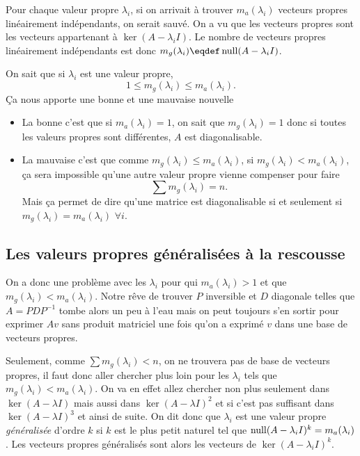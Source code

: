 Pour chaque valeur propre $\lambda_i$,
si on arrivait à trouver $m_a(\lambda_i)$ vecteurs propres linéairement
indépendants, on serait sauvé.
On a vu que les vecteurs propres sont les vecteurs appartenant à
$\ker(A - \lambda_iI)$.
Le nombre de vecteurs propres linéairement indépendants est donc
$m_g(\lambda_i) \eqdef \newnull(A-\lambda_iI)$.

On sait que si $\lambda_i$ est une valeur propre,
\[ 1 \leq m_g(\lambda_i) \leq m_a(\lambda_i). \]
Ça nous apporte une bonne et une mauvaise nouvelle
\begin{itemize}
  \item La bonne c'est que si $m_a(\lambda_i) = 1$,
    on sait que $m_g(\lambda_i) = 1$ donc si toutes les valeurs propres
    sont différentes, $A$ est diagonalisable.
  \item La mauvaise c'est que comme $m_g(\lambda_i) \leq m_a(\lambda_i)$,
    si $m_g(\lambda_i) < m_a(\lambda_i)$, ça sera impossible qu'une
    autre valeur propre vienne compenser pour faire
    \[ \sum m_g(\lambda_i) = n. \]
    Mais ça permet de dire qu'une matrice est diagonalisable si et seulement
    si $m_g(\lambda_i) = m_a(\lambda_i)$ $\forall i$.
\end{itemize}

\subsection{Les valeurs propres généralisées à la rescousse}
On a donc une problème avec les $\lambda_i$ pour qui
$m_a(\lambda_i) > 1$ et que $m_g(\lambda_i) < m_a(\lambda_i)$.
Notre rêve de trouver $P$ inversible et $D$ diagonale
telles que $A = PDP^{-1}$ tombe alors un peu à l'eau mais
on peut toujours s'en sortir pour exprimer $Av$ sans produit matriciel
une fois qu'on a exprimé $v$ dans une base de vecteurs propres.

Seulement, comme $\sum m_g(\lambda_i) < n$, on ne trouvera pas
de base de vecteurs propres, il faut donc aller chercher plus loin
pour les $\lambda_i$ tels que $m_g(\lambda_i) < m_a(\lambda_i)$.
On va en effet allez chercher non plus seulement dans $\ker(A - \lambda I)$
mais aussi dans $\ker(A - \lambda I)^2$ et si c'est pas suffisant dans
$\ker(A - \lambda I)^3$ et ainsi de suite.
On dit donc que $\lambda_i$ est une valeur propre \emph{généralisée}
d'ordre $k$ si $k$ est le plus petit naturel tel que
$\operatorname{null}(A - \lambda_i I)^k = m_a(\lambda_i)$.
Les vecteurs propres généralisés sont alors les vecteurs de
$\ker(A - \lambda_i I)^k$.


